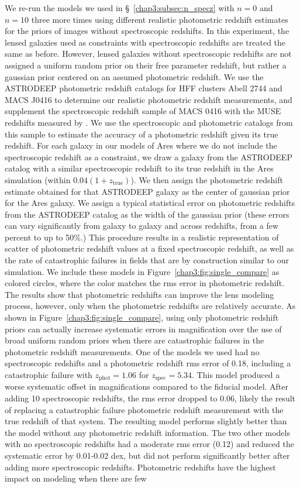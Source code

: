 We re-run the models we used in \S~\ref{chap3:subsec:n_specz} with $n=0$ and $n=10$ three more times using different realistic photometric redshift estimates for the priors of images without spectroscopic redshifts. In this experiment, the lensed galaxies used as constraints with spectroscopic redshifts are treated the same as before. However, lensed galaxies without spectroscopic redshifts are not assigned a uniform random prior on their free parameter redshift, but rather a gaussian prior centered on an assumed photometric redshift. We use the ASTRODEEP photometric redshift catalogs for HFF clusters Abell 2744 and MACS J0416 \citep{Castellano:2016lr} to determine our realistic photometric redshift measurements, and supplement the spectroscopic redshift sample of MACS 0416 with the MUSE redshifts measured by \citet{Caminha:2016fk}. We use the spectroscopic and photometric catalogs from this sample to estimate the accuracy of a photometric redshift given its true redshift. For each galaxy in our models of Ares where we do not include the spectroscopic redshift as a constraint, we draw a galaxy from the ASTRODEEP catalog with a similar spectroscopic redshift to its true redshift in the Ares simulation (within $0.04(1+z_\mathrm{true})$). We then assign the photometric redshift estimate obtained for that ASTRODEEP galaxy as the center of gaussian prior for the Ares galaxy. We assign a typical statistical error on photometric redshifts from the ASTRODEEP catalog as the width of the gaussian prior (these errors can vary significantly from galaxy to galaxy and across redshifts, from a few percent to up to 50\%.) This procedure results in a realistic representation of scatter of photometric redshift values at a fixed spectroscopic redshift, as well as the rate of catastrophic failures in fields that are by construction similar to our simulation. We include these models in Figure~\ref{chap3:fig:single_compare} as colored circles, where the color matches the rms error in photometric redshift. The results show that photometric redshifts can improve the lens modeling process, however, only when the photometric redshifts are relatively accurate. As shown in Figure~\ref{chap3:fig:single_compare}, using only photometric redshift priors can actually increase systematic errors in magnification over the use of broad uniform random priors when there are catastrophic failures in the photometric redshift measurements. One of the models we used had no spectroscopic redshifts and a photometric redshift rms error of 0.18, including a catastrophic failure with $z_\mathrm{phot} = 1.06$ for $z_\mathrm{spec} = 5.34$. This model produced a worse systematic offset in magnifications compared to the fiducial model. After adding 10 spectroscopic redshifts, the rms error dropped to 0.06, likely the result of replacing a catastrophic failure photometric redshift measurement with the true redshift of that system. The resulting model performs slightly better than the model without any photometric redshift information. The two other models with no spectroscopic redshifts had a moderate rms error (0.12) and reduced the systematic error by 0.01-0.02 dex, but did not perform significantly better after adding more spectroscopic redshifts. Photometric redshifts have the highest impact on modeling when there are few 